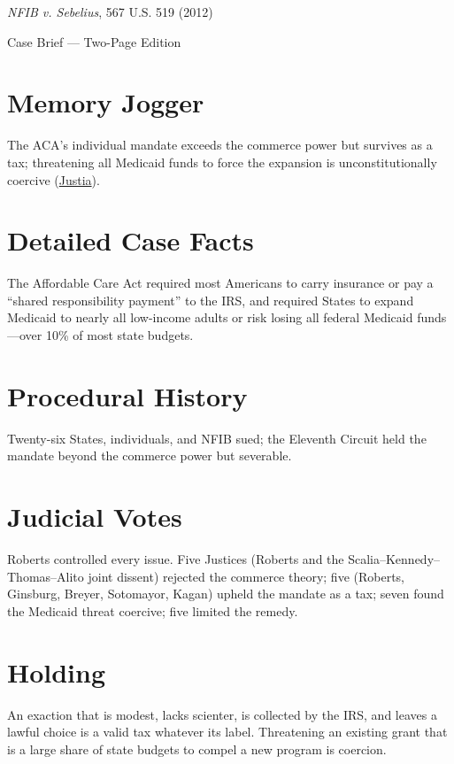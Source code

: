 \documentclass[12pt]{article}
\begin{document}
\begin{center}
{\LARGE \textit{NFIB v. Sebelius}, 567 U.S. 519 (2012)\par}
\vspace{0.5em}
{\large Case Brief --- Two-Page Edition\par}
\end{center}

\section{Memory Jogger}
The ACA's individual mandate exceeds the commerce power but survives as a tax; threatening all Medicaid funds to force the expansion is unconstitutionally coercive (\href{https://supreme.justia.com/cases/federal/us/567/519/}{Justia}).

\section{Detailed Case Facts}
The Affordable Care Act required most Americans to carry insurance or pay a ``shared responsibility payment'' to the IRS, and required States to expand Medicaid to nearly all low-income adults or risk losing all federal Medicaid funds---over 10\% of most state budgets.

\section{Procedural History}
Twenty-six States, individuals, and NFIB sued; the Eleventh Circuit held the mandate beyond the commerce power but severable.

\section{Judicial Votes}
Roberts controlled every issue. Five Justices (Roberts and the Scalia--Kennedy--Thomas--Alito joint dissent) rejected the commerce theory; five (Roberts, Ginsburg, Breyer, Sotomayor, Kagan) upheld the mandate as a tax; seven found the Medicaid threat coercive; five limited the remedy.

\section{Holding}
An exaction that is modest, lacks scienter, is collected by the IRS, and leaves a lawful choice is a valid tax whatever its label. Threatening an existing grant that is a large share of state budgets to compel a new program is coercion.
\end{document}
